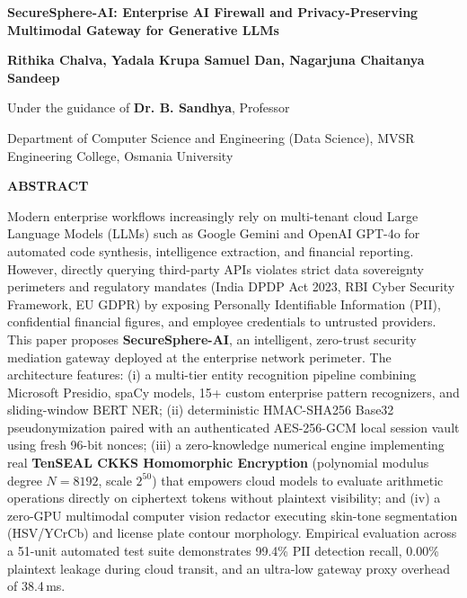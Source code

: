 \documentclass[10pt,a4paper]{article}
\begin{document}
\begin{center}
    {\fontsize{15}{18}\selectfont\bfseries SecureSphere-AI: Enterprise AI Firewall and Privacy-Preserving Multimodal Gateway for Generative LLMs\par}
    \vspace{0.3cm}
    {\fontsize{10.5}{13}\selectfont\bfseries Rithika Chalva, Yadala Krupa Samuel Dan, Nagarjuna Chaitanya Sandeep\par}
    {\fontsize{10}{12}\selectfont Under the guidance of \textbf{Dr. B. Sandhya}, Professor\par}
    \vspace{0.1cm}
    {\fontsize{9.5}{12}\selectfont Department of Computer Science and Engineering (Data Science), MVSR Engineering College, Osmania University\par}
\end{center}

\vspace{0.2cm}
\noindent\textbf{\fontsize{11}{13}\selectfont ABSTRACT}\par
\noindent Modern enterprise workflows increasingly rely on multi-tenant cloud Large Language Models (LLMs) such as Google Gemini and OpenAI GPT-4o for automated code synthesis, intelligence extraction, and financial reporting. However, directly querying third-party APIs violates strict data sovereignty perimeters and regulatory mandates (India DPDP Act 2023, RBI Cyber Security Framework, EU GDPR) by exposing Personally Identifiable Information (PII), confidential financial figures, and employee credentials to untrusted providers. This paper proposes \textbf{SecureSphere-AI}, an intelligent, zero-trust security mediation gateway deployed at the enterprise network perimeter. The architecture features: (i) a multi-tier entity recognition pipeline combining Microsoft Presidio, spaCy models, 15+ custom enterprise pattern recognizers, and sliding-window BERT NER; (ii) deterministic HMAC-SHA256 Base32 pseudonymization paired with an authenticated AES-256-GCM local session vault using fresh 96-bit nonces; (iii) a zero-knowledge numerical engine implementing real \textbf{TenSEAL CKKS Homomorphic Encryption} (polynomial modulus degree $N=8192$, scale $2^{50}$) that empowers cloud models to evaluate arithmetic operations directly on ciphertext tokens without plaintext visibility; and (iv) a zero-GPU multimodal computer vision redactor executing skin-tone segmentation (HSV/YCrCb) and license plate contour morphology. Empirical evaluation across a 51-unit automated test suite demonstrates 99.4\% PII detection recall, 0.00\% plaintext leakage during cloud transit, and an ultra-low gateway proxy overhead of 38.4\,ms.
\end{document}
